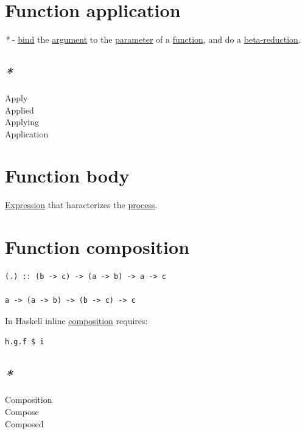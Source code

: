 \documentclass[a4paper,14pt,oneside]{book}
\begin{document}
\section{\label{org7bd54a1}Function application}
\label{sec:org3d2c90c}
\emph{*} - \hyperref[org695d75c]{bind} the \hyperref[org34483c4]{argument} to the \hyperref[orga55841e]{parameter} of a \hyperref[orgee59a2b]{function}, and do a \hyperref[orga911c40]{beta-reduction}.\\

\subsection{\emph{*}}
\label{sec:org792164c}

\label{orgfb0f605}Apply\\
\label{orga4b42bd}Applied\\
\label{org8ea5731}Applying\\
\label{org6880597}Application\\

\section{\label{org637443b}Function body}
\label{sec:orgbe2893b}
\hyperref[orgc25ca10]{Expression} that haracterizes the \hyperref[orgc8d4f36]{process}.\\

\section{\label{orgc6475d4}Function composition}
\label{sec:orgef672a5}
\begin{verbatim}
(.) :: (b -> c) -> (a -> b) -> a -> c

a -> (a -> b) -> (b -> c) -> c
\end{verbatim}

In Haskell inline \hyperref[orgc2aadb6]{composition} requires:\\
\begin{verbatim}
h.g.f $ i
\end{verbatim}

\subsection{\emph{*}}
\label{sec:orga937551}

\label{org00624ff}Composition\\
\label{org7ce3b4c}Compose\\
\label{org2d7f595}Composed\\
\end{document}
